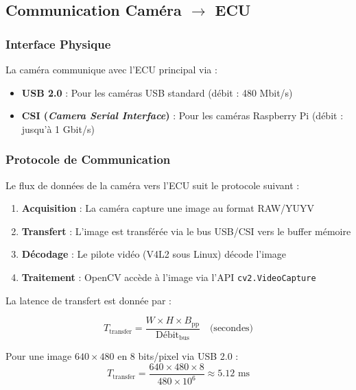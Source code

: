 \documentclass[12pt,a4paper,twoside]{report}
\begin{document}
\subsection{Communication Caméra $\rightarrow$ ECU}

\subsubsection{Interface Physique}

La caméra communique avec l'ECU principal via :
\begin{itemize}
    \item \textbf{USB 2.0} : Pour les caméras USB standard (débit : 480 Mbit/s)
    \item \textbf{CSI (\textit{Camera Serial Interface})} : Pour les caméras Raspberry Pi (débit : jusqu'à 1 Gbit/s)
\end{itemize}

\subsubsection{Protocole de Communication}

Le flux de données de la caméra vers l'ECU suit le protocole suivant :

\begin{enumerate}[leftmargin=2cm]
    \item \textbf{Acquisition} : La caméra capture une image au format RAW/YUYV
    \item \textbf{Transfert} : L'image est transférée via le bus USB/CSI vers le buffer mémoire
    \item \textbf{Décodage} : Le pilote vidéo (V4L2 sous Linux) décode l'image
    \item \textbf{Traitement} : OpenCV accède à l'image via l'API \texttt{cv2.VideoCapture}
\end{enumerate}

La latence de transfert est donnée par :

\begin{equation}
T_{\text{transfer}} = \frac{W \times H \times B_{\text{pp}}}{\text{Débit}_{\text{bus}}} \quad \text{(secondes)}
\label{eq:transfer_latency}
\end{equation}

Pour une image $640 \times 480$ en 8 bits/pixel via USB 2.0 :
\begin{equation}
T_{\text{transfer}} = \frac{640 \times 480 \times 8}{480 \times 10^6} \approx 5.12 \text{ ms}
\end{equation}
\end{document}
